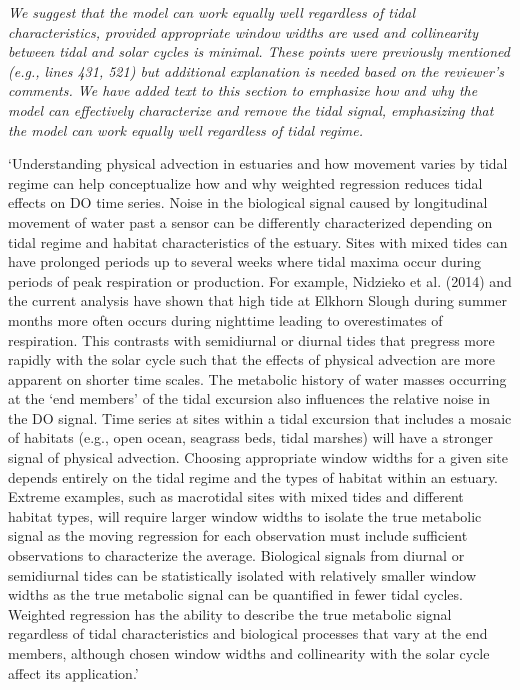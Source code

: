 \documentclass[letterpaper,12pt]{article}\usepackage[]{graphicx}\usepackage[]{color}
\begin{document}
{\it We suggest that the model can work equally well regardless of tidal characteristics, provided appropriate window widths are used and collinearity between tidal and solar cycles is minimal.  These points were previously mentioned (e.g., lines 431, 521) but additional explanation is needed based on the reviewer's comments.  We have added text to this section to emphasize how and why the model can effectively characterize and remove the tidal signal, emphasizing that the model can work equally well regardless of tidal regime. 

`Understanding physical advection in estuaries and how movement varies by tidal regime can help conceptualize how and why weighted regression reduces tidal effects on DO time series.  Noise in the biological signal caused by longitudinal movement of water past a sensor can be differently characterized depending on tidal regime and habitat characteristics of the estuary.  Sites with mixed tides can have prolonged periods up to several weeks where tidal maxima occur during periods of peak respiration or production.  For example, Nidzieko et al. (2014) and the current analysis have shown that high tide at Elkhorn Slough during summer months more often occurs during nighttime leading to overestimates of respiration.  This contrasts with semidiurnal or diurnal tides that pregress more rapidly with the solar cycle such that the effects of physical advection are more apparent on shorter time scales.  The metabolic history of water masses occurring at the `end members' of the tidal excursion also influences the relative noise in the DO signal.  Time series at sites within a tidal excursion that includes a mosaic of habitats (e.g., open ocean, seagrass beds, tidal marshes) will have a stronger signal of physical advection.  Choosing appropriate window widths for a given site depends entirely on the tidal regime and the types of habitat within an estuary.  Extreme examples, such as macrotidal sites with mixed tides and different habitat types, will require larger window widths to isolate the true metabolic signal as the moving regression for each observation must include sufficient observations to characterize the average.  Biological signals from diurnal or semidiurnal tides can be statistically isolated with relatively smaller window widths as the true metabolic signal can be quantified in fewer tidal cycles.  Weighted regression has the ability to describe the true metabolic signal regardless of tidal characteristics and biological processes that vary at the end members, although chosen window widths and collinearity with the solar cycle affect its application.'
}
\end{document}
